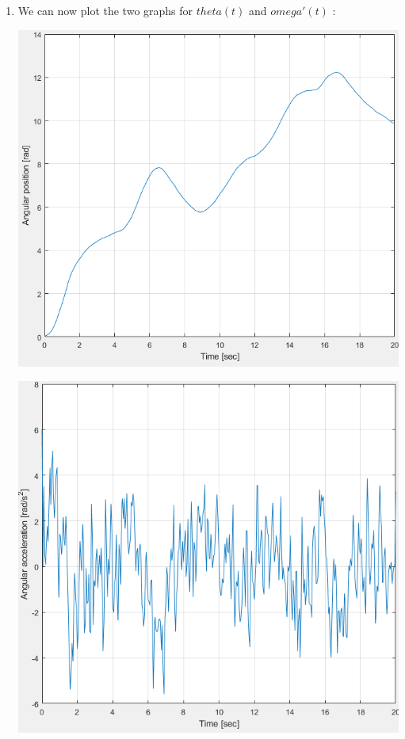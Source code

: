 \documentclass[a4paper,12pt]{article}
\begin{document}
\begin{enumerate}[label={\color{blue}\arabic*)}]
    \item
    We can now plot the two graphs for \(theta(t)\) and \(omega'(t)\) :
    \begin{multicols}{2}
    \begin{flushleft}
            \includegraphics[width=1\linewidth]{Images/theta.png}
            \label{Figure9}
        \end{flushleft}
    \columnbreak
    \begin{flushright}
            \includegraphics[width=1\linewidth]{Images/omega_dot.png}
            \label{Figure10}
        \end{flushright}
        

\end{multicols}
\end{enumerate}
\end{document}
